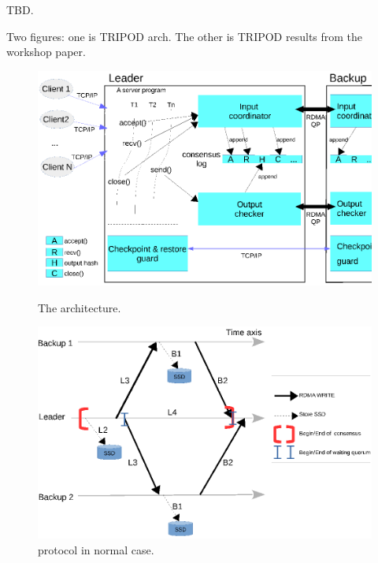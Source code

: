 TBD.

Two figures: one is TRIPOD arch. The other is TRIPOD results from the workshop 
paper.

\begin{figure}[!htb]
    \begin{minipage}{.49\textwidth}
        \includegraphics[width=0.34\textheight]{figures/arch.ps}
        \vspace{0.1in}
        \caption{The \falcon architecture.}
        \label{fig:falcon-arch}
    \end{minipage}
    \begin{minipage}{0.51\textwidth}
        \includegraphics[width=0.34\textheight]{figures/consensus.ps}
        \vspace{0.1in}
        \caption{\falcon protocol in normal case.}
        \label{fig:falcon-protocol}
    \end{minipage}
\end{figure}

